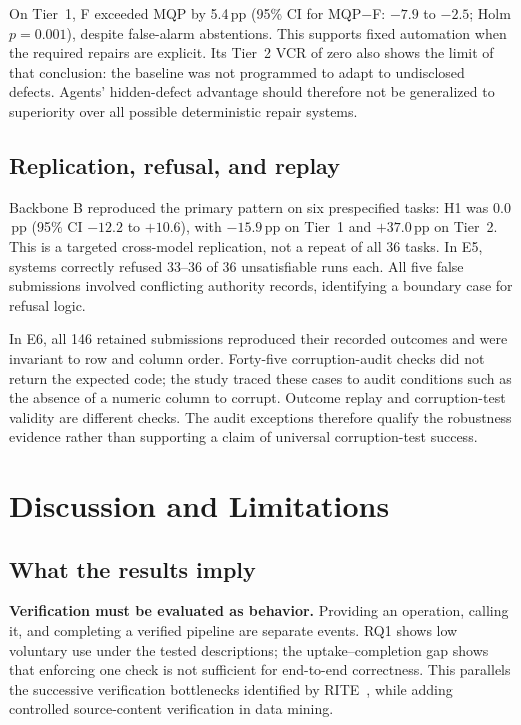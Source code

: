 \documentclass[conference]{IEEEtran}
\newcommand{\sys}[1]{\textsf{#1}}
\begin{document}
On Tier~1, \sys{F} exceeded \sys{MQP} by 5.4\,pp (95\% CI for \sys{MQP}$-$\sys{F}: $-7.9$ to $-2.5$; Holm $p=0.001$), despite false-alarm abstentions. This supports fixed automation when the required repairs are explicit. Its Tier~2 VCR of zero also shows the limit of that conclusion: the baseline was not programmed to adapt to undisclosed defects. Agents' hidden-defect advantage should therefore not be generalized to superiority over all possible deterministic repair systems.

\subsection{Replication, refusal, and replay}
Backbone B reproduced the primary pattern on six prespecified tasks: H1 was $0.0$\,pp (95\% CI $-12.2$ to $+10.6$), with $-15.9$\,pp on Tier~1 and $+37.0$\,pp on Tier~2. This is a targeted cross-model replication, not a repeat of all 36 tasks. In E5, systems correctly refused 33--36 of 36 unsatisfiable runs each. All five false submissions involved conflicting authority records, identifying a boundary case for refusal logic.

In E6, all 146 retained submissions reproduced their recorded outcomes and were invariant to row and column order. Forty-five corruption-audit checks did not return the expected code; the study traced these cases to audit conditions such as the absence of a numeric column to corrupt. Outcome replay and corruption-test validity are different checks. The audit exceptions therefore qualify the robustness evidence rather than supporting a claim of universal corruption-test success.

\section{Discussion and Limitations}
\label{sec:discussion}
\subsection{What the results imply}
\textbf{Verification must be evaluated as behavior.} Providing an operation, calling it, and completing a verified pipeline are separate events. RQ1 shows low voluntary use under the tested descriptions; the uptake--completion gap shows that enforcing one check is not sufficient for end-to-end correctness. This parallels the successive verification bottlenecks identified by RITE~\cite{zhang2026rite}, while adding controlled source-content verification in data mining.
\end{document}
